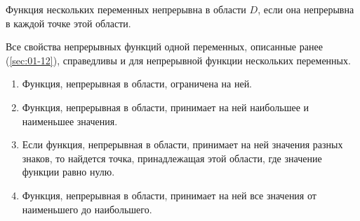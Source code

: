 \begin{definition}
  Функция нескольких переменных непрерывна в области \(D\), если она непрерывна
  в каждой точке этой области.
\end{definition}

\begin{remark}
  Все свойства непрерывных функций одной переменных, описанные ранее
  (\ref{sec:01-12}), справедливы и для непрерывной функции нескольких
  переменных.

  \begin{enumerate}
  \item
    Функция, непрерывная в области, ограничена на ней.

  \item
    Функция, непрерывная в области, принимает на ней наибольшее и наименьшее
    значения.

  \item
    Если функция, непрерывная в области, принимает на ней значения разных
    знаков, то найдется точка, принадлежащая этой области, где значение функции
    равно нулю.

  \item
    Функция, непрерывная в области, принимает на ней все значения от наименьшего
    до наибольшего.
  \end{enumerate}
\end{remark}
